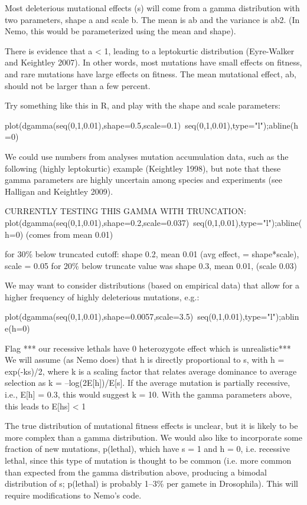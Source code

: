 Most deleterious mutational effects (s) will come from a gamma distribution with two parameters, 
shape a and scale b. The mean is ab and the variance is ab2. (In Nemo, this would be parameterized 
using the mean and shape).
 
There is evidence that a < 1, leading to a leptokurtic distribution (Eyre-Walker and Keightley 2007). 
In other words, most mutations have small effects on fitness, and rare mutations have large effects 
on fitness. The mean mutational effect, ab, should not be larger than a few percent.
 
Try something like this in R, and play with the shape and scale parameters:
 
plot(dgamma(seq(0,1,0.01),shape=0.5,scale=0.1)~seq(0,1,0.01),type="l");abline(h=0)
 
We could use numbers from analyses mutation accumulation data, such as the following (highly 
leptokurtic) example (Keightley 1998), but note that these gamma parameters are highly uncertain 
among species and experiments (see Halligan and Keightley 2009).

CURRENTLY TESTING THIS GAMMA WITH TRUNCATION:
plot(dgamma(seq(0,1,0.01),shape=0.2,scale=0.037)~seq(0,1,0.01),type="l");abline(h=0) 
(comes from mean 0.01)

for 30\% below truncated cutoff: shape 0.2, mean 0.01 (avg effect, = shape*scale), scale = 0.05 
for 20\% below truncate value was shape 0.3, mean 0.01, (scale 0.03)

We may want to consider distributions (based on empirical data) that allow for a higher frequency 
of highly deleterious mutations, e.g.:

plot(dgamma(seq(0,1,0.01),shape=0.0057,scale=3.5)~seq(0,1,0.01),type="l");abline(h=0)

Flag *** our recessive lethals have 0 heterozygote effect which is unrealistic***
We will assume (as Nemo does) that h is directly proportional to s, with h = exp(-ks)/2, where 
k is a scaling factor that relates average dominance to average selection as k = –log(2E[h])/E[s]. 
If the average mutation is partially recessive, i.e., E[h] = 0.3, this would suggest k = 10. 
With the gamma parameters above, this leads to E[hs] < 1%
 
The true distribution of mutational fitness effects is unclear, but it is likely to be more complex than a gamma distribution. 
We would also like to incorporate some fraction of new mutations, p(lethal), which have s = 1 and h = 0, i.e. recessive lethal, 
since this type of mutation is thought to be common (i.e. more common than expected from the gamma distribution above, producing 
a bimodal distribution of s; p(lethal) is probably 1–3\% per gamete in Drosophila). This will require modifications to Nemo’s code.

